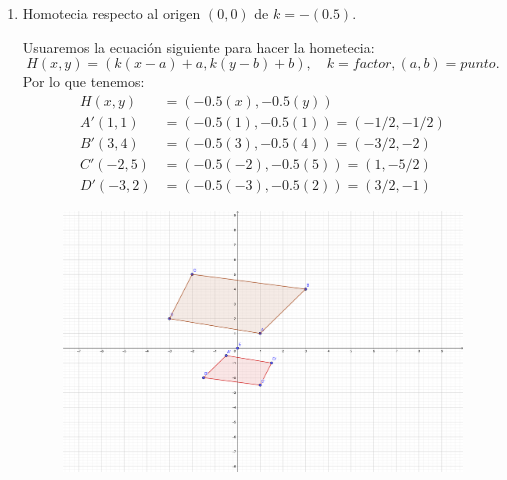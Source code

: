 \begin{problema}
\begin{enumerate}
\begin{enumerate}
\begin{sol}
\begin{figure}[H]
			\end{figure}
		\end{sol}
		\item Homotecia respecto al origen $(0,0)$ de $k=-(0.5)$. 
		\begin{sol}
			Usuaremos la ecuación siguiente para hacer la hometecia: 
			$$H(x,y)=\left(k(x-a)+a, k(y-b)+b\right), \quad k=factor, (a,b)=punto.$$
			Por lo que tenemos: 
			\begin{align*}
				H(x,y)&=\left(-0.5(x), -0.5(y)\right)\\
				A'(1,1)&=\left(-0.5(1), -0.5(1)\right)=(-1/2,-1/2)\\
				B'(3,4)&=\left(-0.5(3), -0.5(4)\right)=(-3/2,-2)\\
				C'(-2,5)&=\left(-0.5(-2), -0.5(5)\right)=(1,-5/2)\\
				D'(-3,2)&=\left(-0.5(-3), -0.5(2)\right)=(3/2,-1)			\end{align*}
			\begin{figure}[H]
				\centering
				\includegraphics[scale=0.7]{Images/P1-5}
			\end{figure}
		\end{sol}
	\end{enumerate}
\end{enumerate}
\end{problema}